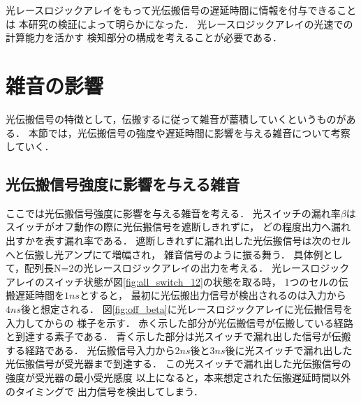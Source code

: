 光レースロジックアレイをもって光伝搬信号の遅延時間に情報を付与できることは
本研究の検証によって明らかになった．
光レースロジックアレイの光速での計算能力を活かす
検知部分の構成を考えることが必要である．

\section{雑音の影響}
光伝搬信号の特徴として，伝搬するに従って雑音が蓄積していくというものがある．
本節では，光伝搬信号の強度や遅延時間に影響を与える雑音について考察していく．
\subsection{光伝搬信号強度に影響を与える雑音}
ここでは光伝搬信号強度に影響を与える雑音を考える．
光スイッチの漏れ率$\beta$はスイッチがオフ動作の際に光伝搬信号を遮断しきれずに，
どの程度出力へ漏れ出すかを表す漏れ率である．
遮断しきれずに漏れ出した光伝搬信号は次のセルへと伝搬し光アンプにて増幅され，
雑音信号のように振る舞う．
具体例として，配列長N=2の光レースロジックアレイの出力を考える．
光レースロジックアレイのスイッチ状態が図\ref{fig:all_switch_12}の状態を取る時，
1つのセルの伝搬遅延時間を$1ns$とすると，
最初に光伝搬出力信号が検出されるのは入力から$4ns$後と想定される．
図\ref{fig:off_beta}に光レースロジックアレイに光伝搬信号を入力してからの
様子を示す．
赤く示した部分が光伝搬信号が伝搬している経路と到達する素子である．
青く示した部分は光スイッチで漏れ出した信号が伝搬する経路である．
光伝搬信号入力から$2ns$後と$3ns$後に光スイッチで漏れ出した
光伝搬信号が受光器まで到達する．
この光スイッチで漏れ出した光伝搬信号の強度が受光器の最小受光感度
以上になると，本来想定された伝搬遅延時間以外のタイミングで
出力信号を検出してしまう．
